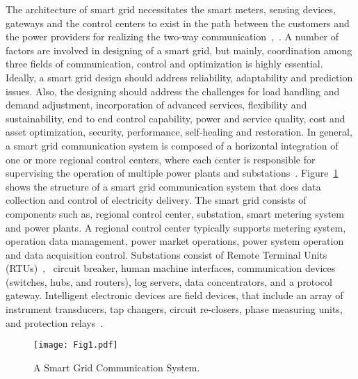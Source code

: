 \par The architecture of smart grid necessitates the smart meters, sensing devices, gateways and the control centers to exist in the path between the customers and the power providers for realizing the two-way communication~\cite{Yan12},~\cite{Fang12}. A number of factors are involved in designing of a smart grid, but mainly, coordination among three fields of communication, control and optimization is highly essential. Ideally, a smart grid design should address reliability, adaptability and prediction issues. Also, the designing should address the challenges for load handling and demand adjustment, incorporation of advanced services, flexibility and sustainability, end to end control capability, power and service quality, cost and asset optimization, security, performance, self-healing and restoration. In general, a smart grid communication system is composed of a horizontal integration of one or more regional control centers, where each center is responsible for supervising the operation of multiple power plants and substations~\cite{Yan12}. Figure~\ref{fig:Fig_1} shows the structure of a smart grid communication system that does data collection and control of electricity delivery. The smart grid consists of components such as, regional control center, substation, smart metering system and power plants. A regional control center typically supports metering system, operation data management, power market operations, power system operation and data acquisition control. Substations consist of Remote Terminal Units (RTUs)~\cite{Deng17},~\cite{Choi10} circuit breaker, human machine interfaces, communication devices (switches, hubs, and routers), log servers, data concentrators, and a protocol gateway. Intelligent electronic devices are field devices, that include an array of instrument transducers, tap changers, circuit re-closers, phase measuring units, and protection relays~\cite{Yan12}.
\begin{figure}[h]
 \centering %
 \texttt{[image: Fig1.pdf]}
 \caption{A Smart Grid Communication System.}
 \label{fig:Fig_1}
\end{figure}

